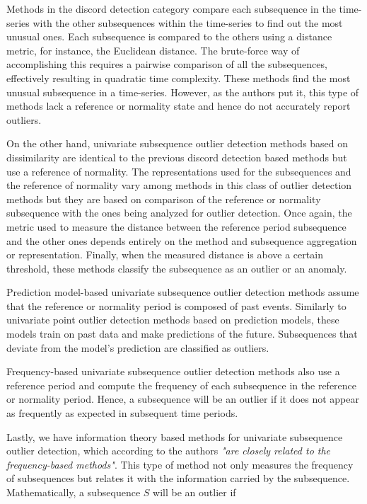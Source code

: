 Methods in the discord detection category compare each subsequence in the time-series with the other subsequences within the time-series to find out the most unusual ones. Each subsequence is compared to the others using a distance metric, for instance, the Euclidean distance. The brute-force way of accomplishing this requires a pairwise comparison of all the subsequences, effectively resulting in quadratic time complexity. These methods find the most unusual subsequence in a time-series. However, as the authors put it, this type of methods lack a reference or normality state and hence do not accurately report outliers.

On the other hand, univariate subsequence outlier detection methods based on dissimilarity are identical to the previous discord detection based methods but use a reference of normality. The representations used for the subsequences and the reference of normality vary among methods in this class of outlier detection methods but they are based on comparison of the reference or normality subsequence with the ones being analyzed for outlier detection. Once again, the metric used to measure the distance between the reference period subsequence and the other ones depends entirely on the method and subsequence aggregation or representation. Finally, when the measured distance is above a certain threshold, these methods classify the subsequence as an outlier or an anomaly.

Prediction model-based univariate subsequence outlier detection methods assume that the reference or normality period is composed of past events. Similarly to univariate point outlier detection methods based on prediction models, these models train on past data and make predictions of the future. Subsequences that deviate from the model's prediction are classified as outliers.

Frequency-based univariate subsequence outlier detection methods also use a reference period and compute the frequency of each subsequence in the reference or normality period. Hence, a subsequence will be an outlier if it does not appear as frequently as expected in subsequent time periods.

Lastly, we have information theory based methods for univariate subsequence outlier detection, which according to the authors \textit{"are closely related to the frequency-based methods"}. This type of method not only measures the frequency of subsequences but relates it with the information carried by the subsequence. Mathematically, a subsequence $S$ will be an outlier if

